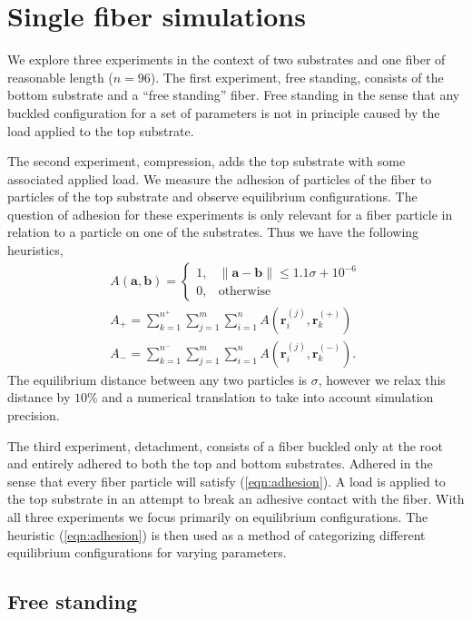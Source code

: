 \chapter{Single fiber simulations} \label{chap:three}

We explore three experiments in the context of two substrates and one fiber of reasonable length ($n=96$). The first experiment, free standing, consists of the bottom substrate and a ``free standing'' fiber. Free standing in the sense that any buckled configuration for a set of parameters is not in principle caused by the load applied to the top substrate.

The second experiment, compression, adds the top substrate with some associated applied load. We measure the adhesion of particles of the fiber to particles of the top substrate and observe equilibrium configurations. The question of adhesion for these experiments is only relevant for a fiber particle in relation to a particle on one of the substrates. Thus we have the following heuristics,
\begin{eqnarray} \label{eqn:adhesion}
	A(\textbf{a}, \textbf{b}) = \left\{ 
		\begin{array}{ll}
			1, & \|\textbf{a} - \textbf{b}\| \leq 1.1 \sigma + 10^{-6}\\
			0, & \mbox{otherwise}
		\end{array}
		\right.  \\
	A_+ = \sum_{k=1}^{n^+} \sum_{j=1}^{m} \sum_{i=1}^{n} A(\textbf{r}_i^{(j)},\textbf{r}_k^{(+)}) \label{eqn:adhesion:top} \\ 
	A_- = \sum_{k=1}^{n^-} \sum_{j=1}^{m} \sum_{i=1}^{n} A(\textbf{r}_i^{(j)},\textbf{r}_k^{(-)}). \label{eqn:adhesion:bottom}
\end{eqnarray}
The equilibrium distance between any two particles is $\sigma$, however we relax this distance by $10\%$ and a numerical translation to take into account simulation precision.

The third experiment, detachment, consists of a fiber buckled only at the root and entirely adhered to both the top and bottom substrates. Adhered in the sense that every fiber particle will satisfy (\ref{eqn:adhesion}). A load is applied to the top substrate in an attempt to break an adhesive contact with the fiber. With all three experiments we focus primarily on equilibrium configurations. The heuristic (\ref{eqn:adhesion}) is then used as a method of categorizing different equilibrium configurations for varying parameters.

\section{Free standing}

